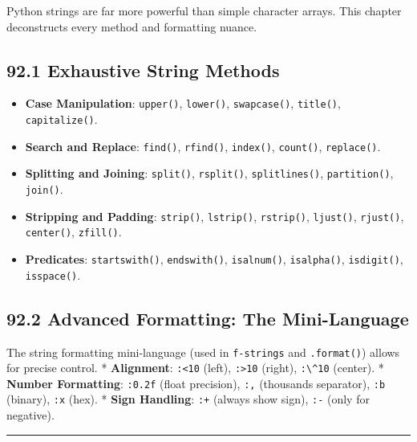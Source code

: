 Python strings are far more powerful than simple character arrays. This
chapter deconstructs every method and formatting nuance.

\hypertarget{exhaustive-string-methods}{%
\subsection{92.1 Exhaustive String
Methods}\label{exhaustive-string-methods}}

\begin{itemize}
\tightlist
\item
  \textbf{Case Manipulation}: \passthrough{\lstinline!upper()!},
  \passthrough{\lstinline!lower()!},
  \passthrough{\lstinline!swapcase()!},
  \passthrough{\lstinline!title()!},
  \passthrough{\lstinline!capitalize()!}.
\item
  \textbf{Search and Replace}: \passthrough{\lstinline!find()!},
  \passthrough{\lstinline!rfind()!}, \passthrough{\lstinline!index()!},
  \passthrough{\lstinline!count()!},
  \passthrough{\lstinline!replace()!}.
\item
  \textbf{Splitting and Joining}: \passthrough{\lstinline!split()!},
  \passthrough{\lstinline!rsplit()!},
  \passthrough{\lstinline!splitlines()!},
  \passthrough{\lstinline!partition()!},
  \passthrough{\lstinline!join()!}.
\item
  \textbf{Stripping and Padding}: \passthrough{\lstinline!strip()!},
  \passthrough{\lstinline!lstrip()!},
  \passthrough{\lstinline!rstrip()!}, \passthrough{\lstinline!ljust()!},
  \passthrough{\lstinline!rjust()!}, \passthrough{\lstinline!center()!},
  \passthrough{\lstinline!zfill()!}.
\item
  \textbf{Predicates}: \passthrough{\lstinline!startswith()!},
  \passthrough{\lstinline!endswith()!},
  \passthrough{\lstinline!isalnum()!},
  \passthrough{\lstinline!isalpha()!},
  \passthrough{\lstinline!isdigit()!},
  \passthrough{\lstinline!isspace()!}.
\end{itemize}

\hypertarget{advanced-formatting-the-mini-language}{%
\subsection{92.2 Advanced Formatting: The
Mini-Language}\label{advanced-formatting-the-mini-language}}

The string formatting mini-language (used in
\passthrough{\lstinline!f-strings!} and
\passthrough{\lstinline!.format()!}) allows for precise control. *
\textbf{Alignment}: \passthrough{\lstinline!:<10!} (left),
\passthrough{\lstinline!:>10!} (right), \passthrough{\lstinline!:\^10!}
(center). * \textbf{Number Formatting}: \passthrough{\lstinline!:0.2f!}
(float precision), \passthrough{\lstinline!:,!} (thousands separator),
\passthrough{\lstinline!:b!} (binary), \passthrough{\lstinline!:x!}
(hex). * \textbf{Sign Handling}: \passthrough{\lstinline!:+!} (always
show sign), \passthrough{\lstinline!:-!} (only for negative).

\begin{center}\rule{0.5\linewidth}{0.5pt}\end{center}
